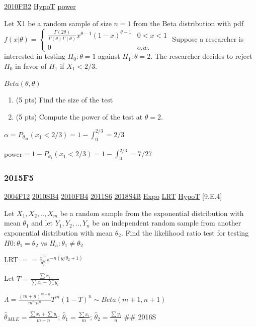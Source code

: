 \documentclass[10pt,twocolumn,portrait]{article}
\begin{document}
\protect\hyperlink{fb2-1}{2010FB2} \protect\hyperlink{HypoT}{HypoT}
\protect\hyperlink{power}{power}

Let X1 be a random sample of size \(n=1\) from the Beta distribution
with pdf
\(f(x|\theta)=\begin{cases}\frac{\Gamma(2\theta)}{\Gamma(\theta)\Gamma(\theta)}x^{\theta-1}(1-x)^{\theta-1}&0<x<1\\0&o.w.\end{cases}\)
Suppose a researcher is interested in testing \(H_0:\theta=1\) against
\(H_1:\theta=2\). The researcher decides to reject \(H_0\) in favor of
\(H_1\) if \(X_1<2/3\).

\(Beta(\theta,\theta)\)

\begin{enumerate}
\def\labelenumi{(\alph{enumi})}
\item
  (5 pts) Find the size of the test
\item
  (5 pts) Compute the power of the test at \(\theta=2\).
\end{enumerate}

\(\alpha=P_{\theta_01}(x_1<2/3)=1-\int_0^{2/3}=2/3\)

power\(=1-P_{\theta_1}(x_1<2/3)=1-\int_0^{2/3}=7/27\)

\hypertarget{f5-5}{%
\subsubsection{2015F5}\label{f5-5}}

\protect\hyperlink{f12}{2004F12} \protect\hyperlink{sb4}{2010SB4}
\protect\hyperlink{fb4-1}{2010FB4} \protect\hyperlink{s6-2}{2011S6}
\protect\hyperlink{s4b-2}{2018S4B} \protect\hyperlink{Expo}{Expo}
\protect\hyperlink{LRT}{LRT} \protect\hyperlink{HypoT}{HypoT}
{[}9.E.4{]}

Let \(X_1,X_2,..,X_{m}\) be a random sample from the exponential
distribution with mean \(\theta_1\) and let \(Y_1,Y_2,..,Y_{n}\) be an
independent random sample from another exponential distribution with
mean \(\theta_2\). Find the likelihood ratio test for testing
\(H0:\theta_1=\theta_2\) vs \(H_a:\theta_1\neq\theta_2\)

LRT \(==\frac{\bar x^m}{\theta_2^n}e^{-n(\bar y/\theta_2+1)}\)

Let \(T=\frac{\sum x_i}{\sum x_i+\sum y_i}\)

\(\Lambda=\frac{(m+n)^{m+n}}{m^mn^n}T^m(1-T)^n\sim Beta(m+1,n+1)\)

\(\hat\theta_{MLE}=\frac{\sum x_i+\sum y_i}{m+n}\);
\(\hat\theta_{1}=\frac{\sum x_i}{m}\);
\(\hat\theta_{2}=\frac{\sum y_i}{n}\) \#\# 2016S
\end{document}
